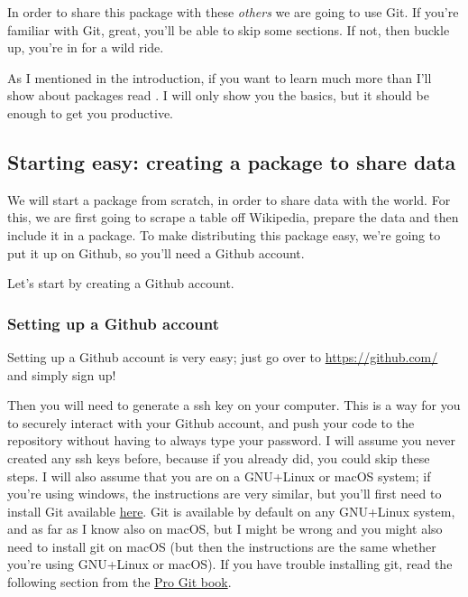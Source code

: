 \documentclass[
]{article}
\begin{document}
In order to share this package with these \emph{others} we are going to use Git. If you're familiar with
Git, great, you'll be able to skip some sections. If not, then buckle up, you're in for a wild ride.

As I mentioned in the introduction, if you want to learn much more than I'll show about packages
read \citet{wickham2015}. I will only show you the basics, but it should be enough to get you productive.

\hypertarget{starting-easy-creating-a-package-to-share-data}{%
\subsection{Starting easy: creating a package to share data}\label{starting-easy-creating-a-package-to-share-data}}

We will start a package from scratch, in order to share data with the world. For this, we are first
going to scrape a table off Wikipedia, prepare the data and then include it in a package. To make
distributing this package easy, we're going to put it up on Github, so you'll need a Github account.

Let's start by creating a Github account.

\hypertarget{setting-up-a-github-account}{%
\subsubsection{Setting up a Github account}\label{setting-up-a-github-account}}

Setting up a Github account is very easy; just go over to \url{https://github.com/}
and simply sign up!

Then you will need to generate a ssh key on your computer. This is a way for you to securely
interact with your Github account, and push your code to the repository without having to always
type your password. I will assume you never created any ssh
keys before, because if you already did, you could skip these steps. I will also assume that you are
on a GNU+Linux or macOS system; if you're using windows, the instructions are very similar, but
you'll first need to install Git available \href{https://git-scm.com/downloads}{here}. Git is available
by default on any GNU+Linux system, and as far as I know also on macOS, but I might be wrong and
you might also need to install git on macOS (but then the instructions are the same whether
you're using GNU+Linux or macOS). If you have trouble installing git, read the following section
from the \href{https://git-scm.com/book/en/v2/Getting-Started-Installing-Git}{Pro Git book}.
\end{document}
